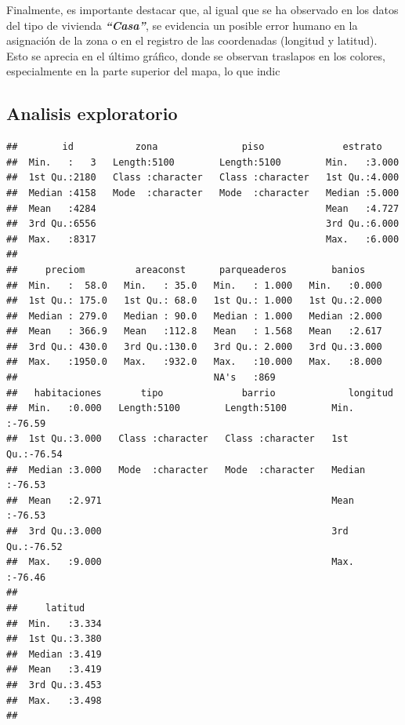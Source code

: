 \documentclass[
]{article}
\begin{document}
Finalmente, es importante destacar que, al igual que se ha observado en
los datos del tipo de vivienda \textbf{\emph{``Casa''}}, se evidencia un
posible error humano en la asignación de la zona o en el registro de las
coordenadas (longitud y latitud). Esto se aprecia en el último gráfico,
donde se observan traslapos en los colores, especialmente en la parte
superior del mapa, lo que indic

\subsection{\texorpdfstring{\textbf{Analisis
exploratorio}}{Analisis exploratorio}}\label{analisis-exploratorio}

\begin{verbatim}
##        id           zona               piso              estrato     
##  Min.   :   3   Length:5100        Length:5100        Min.   :3.000  
##  1st Qu.:2180   Class :character   Class :character   1st Qu.:4.000  
##  Median :4158   Mode  :character   Mode  :character   Median :5.000  
##  Mean   :4284                                         Mean   :4.727  
##  3rd Qu.:6556                                         3rd Qu.:6.000  
##  Max.   :8317                                         Max.   :6.000  
##                                                                      
##     preciom         areaconst      parqueaderos        banios     
##  Min.   :  58.0   Min.   : 35.0   Min.   : 1.000   Min.   :0.000  
##  1st Qu.: 175.0   1st Qu.: 68.0   1st Qu.: 1.000   1st Qu.:2.000  
##  Median : 279.0   Median : 90.0   Median : 1.000   Median :2.000  
##  Mean   : 366.9   Mean   :112.8   Mean   : 1.568   Mean   :2.617  
##  3rd Qu.: 430.0   3rd Qu.:130.0   3rd Qu.: 2.000   3rd Qu.:3.000  
##  Max.   :1950.0   Max.   :932.0   Max.   :10.000   Max.   :8.000  
##                                   NA's   :869                     
##   habitaciones       tipo              barrio             longitud     
##  Min.   :0.000   Length:5100        Length:5100        Min.   :-76.59  
##  1st Qu.:3.000   Class :character   Class :character   1st Qu.:-76.54  
##  Median :3.000   Mode  :character   Mode  :character   Median :-76.53  
##  Mean   :2.971                                         Mean   :-76.53  
##  3rd Qu.:3.000                                         3rd Qu.:-76.52  
##  Max.   :9.000                                         Max.   :-76.46  
##                                                                        
##     latitud     
##  Min.   :3.334  
##  1st Qu.:3.380  
##  Median :3.419  
##  Mean   :3.419  
##  3rd Qu.:3.453  
##  Max.   :3.498  
## 
\end{verbatim}
\end{document}
